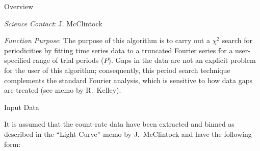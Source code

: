 %
\def\version{\it Version 1.1 --- 3/31/86}
\def\chapter{\it Timing Analysis: Period searching via truncated
Fourier series}

\@{Overview}

\noindent
{\it Science Contact}:  J. McClintock

\noindent
{\it Function Purpose}: 
The purpose of this algorithm is to carry out a $\chi^2$ search for
periodicities by fitting time series data to a truncated Fourier
series for a user-specified range of trial periods ($P$).  Gaps in the
data are not an explicit problem for the user of this algorithm;
consequently, this period search technique complements the standard Fourier
analysis, which is sensitive to how data gaps are treated (see
memo by R.~Kelley).

\@{Input Data}

\vskip 12pt


\vskip 12pt

It is assumed that the count-rate data have been extracted and binned
as described in the ``Light Curve'' memo by J.~McClintock and have the
following form:

\vskip 12pt


